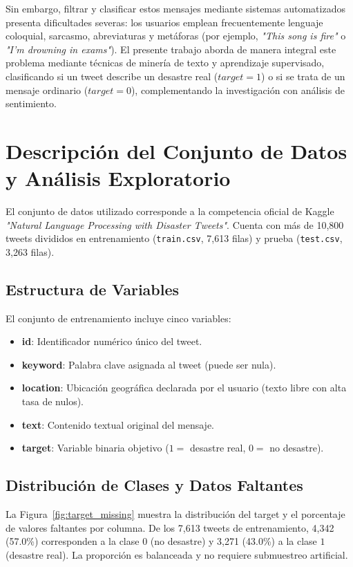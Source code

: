 \documentclass[11pt,a4paper]{article}
\begin{document}
Sin embargo, filtrar y clasificar estos mensajes mediante sistemas automatizados presenta dificultades severas: los usuarios emplean frecuentemente lenguaje coloquial, sarcasmo, abreviaturas y metáforas (por ejemplo, \textit{"This song is fire"} o \textit{"I'm drowning in exams"}). El presente trabajo aborda de manera integral este problema mediante técnicas de minería de texto y aprendizaje supervisado, clasificando si un tweet describe un desastre real ($target = 1$) o si se trata de un mensaje ordinario ($target = 0$), complementando la investigación con análisis de sentimiento.

\section{Descripción del Conjunto de Datos y Análisis Exploratorio}
El conjunto de datos utilizado corresponde a la competencia oficial de Kaggle \textit{"Natural Language Processing with Disaster Tweets"}. Cuenta con más de 10,800 tweets divididos en entrenamiento (\texttt{train.csv}, 7,613 filas) y prueba (\texttt{test.csv}, 3,263 filas).

\subsection{Estructura de Variables}
El conjunto de entrenamiento incluye cinco variables:
\begin{itemize}
    \item \textbf{id}: Identificador numérico único del tweet.
    \item \textbf{keyword}: Palabra clave asignada al tweet (puede ser nula).
    \item \textbf{location}: Ubicación geográfica declarada por el usuario (texto libre con alta tasa de nulos).
    \item \textbf{text}: Contenido textual original del mensaje.
    \item \textbf{target}: Variable binaria objetivo ($1 =$ desastre real, $0 =$ no desastre).
\end{itemize}

\subsection{Distribución de Clases y Datos Faltantes}
La Figura~\ref{fig:target_missing} muestra la distribución del target y el porcentaje de valores faltantes por columna. De los 7,613 tweets de entrenamiento, 4,342 (57.0\%) corresponden a la clase $0$ (no desastre) y 3,271 (43.0\%) a la clase $1$ (desastre real). La proporción es balanceada y no requiere submuestreo artificial.
\end{document}
